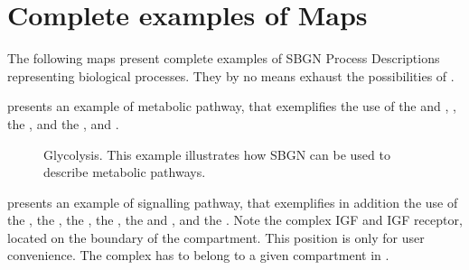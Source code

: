 \chapter{Complete examples of \PD Maps}

The following maps present complete examples of SBGN Process Descriptions representing biological processes. They by no means exhaust the possibilities of  \SBGNPDLone.

 presents an example of metabolic pathway, that exemplifies the use of the   and , , the  , and the  ,  and .

\begin{figure}[htb]
\begin{center}
\caption{Glycolysis. This example illustrates how SBGN can be used to describe metabolic pathways.}\label{fig:glycolysis}
\end{center}
\end{figure}

 presents an example of signalling pathway, that exemplifies in addition the use of the  , the , the  , the , the   and , and the  . Note the complex IGF and IGF receptor, located on the boundary of the compartment. This position is only for user convenience. The complex has to belong to a given compartment in \SBGNPDLone.

